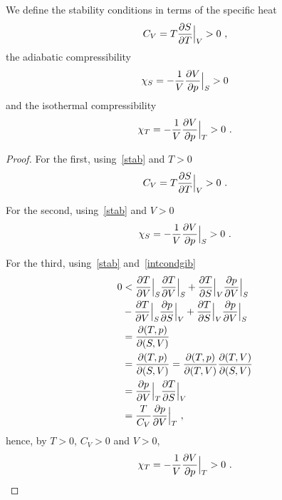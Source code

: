     We define the stability conditions in terms of the specific heat 
    \begin{equation*}
        C_V = T \frac{\partial S}{\partial T} \Big \vert_{V} > 0 ~,
    \end{equation*}
    the adiabatic compressibility
    \begin{equation*}
        \chi_S = - \frac{1}{V} \frac{\partial V}{\partial p} \Big \vert_S > 0
    \end{equation*}
    and the isothermal compressibility 
    \begin{equation*}
        \chi_T = - \frac{1}{V} \frac{\partial V}{\partial p} \Big \vert_T > 0 ~.
    \end{equation*}
    \begin{proof}
        For the first, using~\eqref{stab} and $T > 0$
        \begin{equation*}
            C_V = T \frac{\partial S}{\partial T} \Big \vert_{V} > 0 ~.
        \end{equation*}

        For the second, using~\eqref{stab} and $V > 0$
        \begin{equation*}
            \chi_S = - \frac{1}{V} \frac{\partial V}{\partial p} \Big \vert_S > 0 ~.
        \end{equation*}
        
        For the third, using~\eqref{stab} and~\eqref{intcondgib}
        \begin{equation*}
        \begin{aligned}
            0 & < \frac{\partial T}{\partial V} \Big \vert_S \frac{\partial T}{\partial V} \Big \vert_S + \frac{\partial T}{\partial S} \Big \vert_V \frac{\partial p}{\partial V} \Big \vert_S \\ &  - \frac{\partial T}{\partial V} \Big \vert_S \frac{\partial p}{\partial S} \Big \vert_V + \frac{\partial T}{\partial S} \Big \vert_V \frac{\partial p}{\partial V} \Big \vert_S \\ & = \frac{\partial(T,p)}{\partial(S,V)} \\ & = \frac{\partial(T,p)}{\partial(S,V)} = \frac{\partial(T,p)}{\partial(T,V)} \frac{\partial(T,V)}{\partial(S,V)} \\ & = \frac{\partial p}{\partial V} \Big \vert_T \frac{\partial T}{\partial S} \Big \vert_V \\ & = \frac{T}{C_V} \frac{\partial p}{\partial V} \Big \vert_T ~,
        \end{aligned}
        \end{equation*}
        hence, by $T>0$, $C_V>0$ and $V>0$, 
        \begin{equation*}
            \chi_T = - \frac{1}{V} \frac{\partial V}{\partial p} \Big \vert_T > 0 ~.
        \end{equation*}
    \end{proof}

